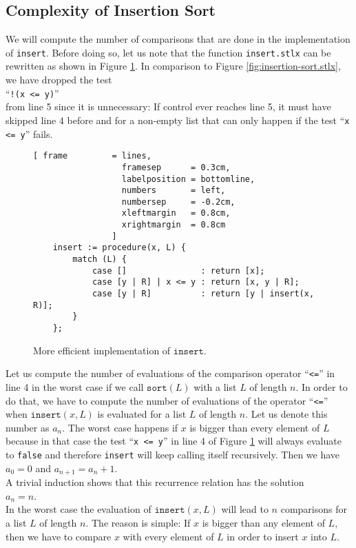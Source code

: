 \subsection{Complexity of Insertion Sort}
We will compute the number of comparisons that are done in the implementation of \texttt{insert}.
Before doing so, let us note that the function \texttt{insert.stlx} can be rewritten as shown in Figure
\ref{fig:insert.stlx}.  In comparison to Figure \ref{fig:insertion-sort.stlx}, we have dropped the
test
\\[0.2cm]
\hspace*{1.3cm}
``\texttt{!(x <= y)}'' 
\\[0.2cm]
from line 5 since it is unnecessary:  If control ever reaches line 5, it must
have skipped line 4 before and for a non-empty list that can only happen if the test 
``\texttt{x <= y}'' fails.
\begin{figure}[!ht]
  \centering
\begin{Verbatim}[ frame         = lines, 
                  framesep      = 0.3cm, 
                  labelposition = bottomline,
                  numbers       = left,
                  numbersep     = -0.2cm,
                  xleftmargin   = 0.8cm,
                  xrightmargin  = 0.8cm
                ]
    insert := procedure(x, L) {
        match (L) {
            case []               : return [x];
            case [y | R] | x <= y : return [x, y | R];
            case [y | R]          : return [y | insert(x, R)];
        }
    };
\end{Verbatim}
\vspace*{-0.3cm}
  \caption{More efficient implementation of $\mathtt{insert}$.}
  \label{fig:insert.stlx}
\end{figure} 

Let us compute the number of evaluations of the comparison operator ``\texttt{<=}'' in line 4 in the
worst case if we call $\texttt{sort}(L)$ with a list $L$ of length $n$. In order to do that, we have to
compute the number of evaluations of the operator ``\texttt{<=}'' when 
 $\texttt{insert}(x,L)$ is evaluated for a list $L$ of length $n$.  Let us denote this number as 
$a_n$.  The worst case happens if $x$ is bigger than every element of $L$ because in that case the
test ``\texttt{x <= y}'' in line 4 of Figure \ref{fig:insert.stlx} will always evaluate to
\texttt{false} and therefore \texttt{insert} will keep calling itself recursively.
Then we have
\\[0.2cm]
\hspace*{1.3cm}
$a_0 = 0$ \quad and \quad $a_{n+1} = a_n + 1$. 
\\[0.2cm]
A trivial induction shows that this recurrence relation has the solution
\\[0.2cm]
\hspace*{1.3cm} 
$a_n = n$.
\\[0.2cm]
In the worst case the evaluation of $\mathtt{insert}(x,L)$ will lead to $n$ comparisons for a list
$L$ of length $n$.  The reason is simple:  If $x$ is bigger than any element of $L$, then we have to
compare $x$ with every element of $L$ in order to insert $x$ into $L$.

